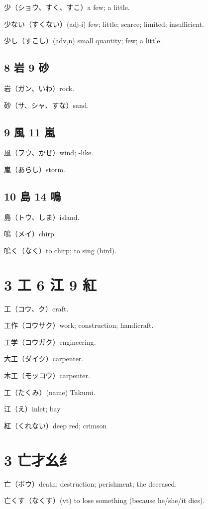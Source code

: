 少（ショウ、すく、すこ）a few; a little.

少ない（すくない）(adj-i) few; little; scarce; limited; insufficient.

少し（すこし）(adv,n) small quantity; few; a little.

\subsection{8 岩 9 砂}

岩（ガン、いわ）rock.

砂（サ、シャ、すな）sand.

\subsection{9 風 11 嵐}

風（フウ、かぜ）wind; -like.

嵐（あらし）storm.

\subsection{10 島 14 鳴}

島（トウ、しま）island.

鳴（メイ）chirp.

鳴く（なく）to chirp; to sing (bird).

\section{3 工 6 江 9 紅}

工（コウ、ク）craft.

工作（コウサク）work; construction; handicraft.

工学（コウガク）engineering.

大工（ダイク）carpenter.

木工（モッコウ）carpenter.

工（たくみ）(name) Takumi.

江（え）inlet; bay

紅（くれない）deep red; crimson

\section{3 亡才幺纟}

亡（ボウ）death; destruction; perishment; the deceased.

亡くす（なくす）(vt) to lose something (because he/she/it dies).

